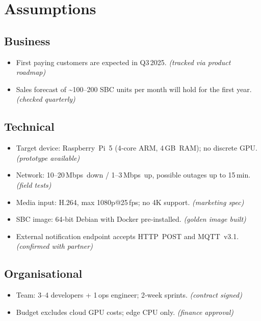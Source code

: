 \documentclass[11pt,a4paper]{article}
\begin{document}
\section{Assumptions}\label{sec:assumptions}

\subsection*{Business}
\begin{itemize}
  \item First paying customers are expected in Q3 2025. \emph{(tracked via product roadmap)}
  \item Sales forecast of \textasciitilde100–200 SBC units per month will hold for the first year. \emph{(checked quarterly)}
\end{itemize}

\subsection*{Technical}
\begin{itemize}
  \item Target device: Raspberry Pi 5 (4‑core ARM, 4 GB RAM); no discrete GPU. \emph{(prototype available)}
  \item Network: 10–20 Mbps down / 1–3 Mbps up, possible outages up to 15 min. \emph{(field tests)}
  \item Media input: H.264, max 1080p@25 fps; no 4K support. \emph{(marketing spec)}
  \item SBC image: 64‑bit Debian with Docker pre‑installed. \emph{(golden image built)}
  \item External notification endpoint accepts HTTP POST and MQTT v3.1. \emph{(confirmed with partner)}
\end{itemize}

\subsection*{Organisational}
\begin{itemize}
  \item Team: 3–4 developers + 1 ops engineer; 2‑week sprints. \emph{(contract signed)}
  \item Budget excludes cloud GPU costs; edge CPU only. \emph{(finance approval)}
\end{itemize}
\end{document}
